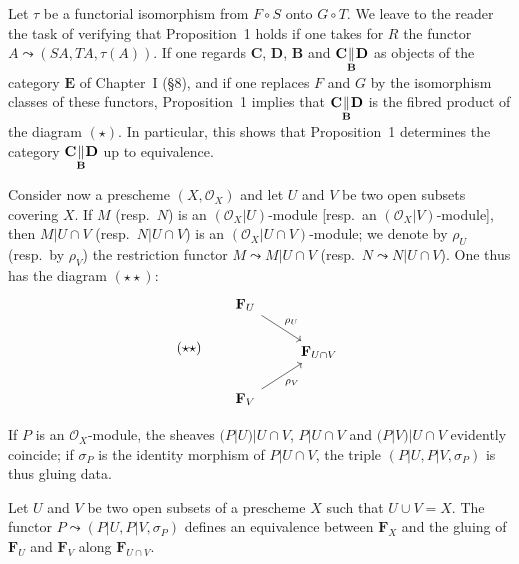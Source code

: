 Let $\tau$ be a functorial isomorphism from $F \circ S$ onto
$G \circ T$. We leave to the reader the task of verifying that
Proposition~1 holds if one takes for $R$ the functor
$A \leadsto (SA, TA, \tau(A))$. If one regards $\mathbf{C}$, $\mathbf{D}$, $\mathbf{B}$ and
$\mathbf{C} \underset{\mathbf{B}}{\Vert} \mathbf{D}$ as objects of the
category $\mathbf{E}$ of Chapter~I (\S8), and if one replaces $F$ and $G$
by the isomorphism classes of these functors, Proposition~1 implies that
$\mathbf{C} \underset{\mathbf{B}}{\Vert} \mathbf{D}$ is the fibred product of
the diagram $(\star)$. In particular, this shows that Proposition~1
determines the category
$\mathbf{C} \underset{\mathbf{B}}{\Vert} \mathbf{D}$ up to equivalence.

Consider now a prescheme $(X, \mathcal{O}_X)$ and let $U$ and $V$ be two
open subsets covering $X$. If $M$ (resp.\ $N$) is an
$(\mathcal{O}_X|U)$-module [resp.\ an $(\mathcal{O}_X|V)$-module], then
$M|U \cap V$ (resp.\ $N|U \cap V$) is an
$(\mathcal{O}_X|U \cap V)$-module; we denote by $\rho_U$ (resp.\ by $\rho_V$)
the restriction functor $M \leadsto M|U \cap V$ (resp.\ $N \leadsto
N|U \cap V$). One thus has the diagram $(\star\star)$:
\[
(\star\star)\qquad
\begin{tikzcd}
\mathbf{F}_U \arrow[dr, "\rho_U"] \\
& \mathbf{F}_{U \cap V} \\
\mathbf{F}_V \arrow[ur, "\rho_V"']
\end{tikzcd}
\]

If $P$ is an $\mathcal{O}_X$-module, the sheaves $(P|U)|U \cap V$,
$P|U \cap V$ and $(P|V)|U \cap V$ evidently coincide; if $\sigma_P$ is
the identity morphism of $P|U \cap V$, the triple
$(P|U, P|V, \sigma_P)$ is thus gluing data.

\begin{proposition}
Let $U$ and $V$ be two open subsets of a prescheme $X$ such that
$U \cup V = X$. The functor $P \leadsto (P|U, P|V, \sigma_P)$ defines an
equivalence between $\mathbf{F}_X$ and the gluing of $\mathbf{F}_U$ and
$\mathbf{F}_V$ along $\mathbf{F}_{U \cap V}$.
\end{proposition}

